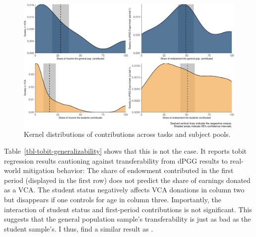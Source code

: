 \documentclass[
  authoryear,
  review,
  3p,
  onecolumn]{elsarticle}
\begin{document}
\begin{figure}

{\centering \includegraphics{paper_files/figure-pdf/fig-kernel-generalizability-1.pdf}

}

\caption{\label{fig-kernel-generalizability}Kernel distributions of
contributions across tasks and subject pools.}

\end{figure}

Table~\ref{tbl-tobit-generalizability} shows that this is not the case.
It reports tobit regression results cautioning against transferability
from dPGG results to real-world mitigation behavior: The share of
endowment contributed in the first period (displayed in the first row)
does not predict the share of earnings donated as a VCA. The student
status negatively affects VCA donations in column two but disappears if
one controls for age in column three. Importantly, the interaction of
student status and first-period contributions is not significant. This
suggests that the general population sample's transferability is just as
bad as the student sample's. I thus, find a similar result as
\citet[p.6]{GKLS2020}.
\end{document}
